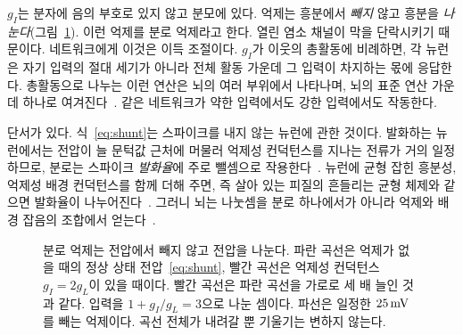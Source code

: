 $g_I$는 분자에 음의 부호로 있지 않고 분모에 있다. 억제는 흥분에서 \emph{빼지} 않고 흥분을 \emph{나눈다}(그림~\ref{fig:shunt}). 이런 억제를 분로 억제라고 한다. 열린 염소 채널이 막을 단락시키기 때문이다. 네트워크에게 이것은 이득 조절이다. $g_I$가 이웃의 총활동에 비례하면, 각 뉴런은 자기 입력의 절대 세기가 아니라 전체 활동 가운데 그 입력이 차지하는 몫에 응답한다. 총활동으로 나누는 이런 연산은 뇌의 여러 부위에서 나타나며, 뇌의 표준 연산 가운데 하나로 여겨진다~\cite{Carandini2012}. 같은 네트워크가 약한 입력에서도 강한 입력에서도 작동한다.

단서가 있다. 식~\eqref{eq:shunt}는 스파이크를 내지 않는 뉴런에 관한 것이다. 발화하는 뉴런에서는 전압이 늘 문턱값 근처에 머물러 억제성 컨덕턴스를 지나는 전류가 거의 일정하므로, 분로는 스파이크 \emph{발화율}에 주로 뺄셈으로 작용한다~\cite{HoltKoch1997}. 뉴런에 균형 잡힌 흥분성, 억제성 배경 컨덕턴스를 함께 더해 주면, 즉 살아 있는 피질의 흔들리는 균형 체제와 같으면 발화율이 나누어진다~\cite{Chance2002}. 그러니 뇌는 나눗셈을 분로 하나에서가 아니라 억제와 배경 잡음의 조합에서 얻는다~\cite{Carandini2012}.

\begin{figure}[t]
\centering
{}
\caption{분로 억제는 전압에서 빼지 않고 전압을 나눈다. 파란 곡선은 억제가 없을 때의 정상 상태 전압~\eqref{eq:shunt}, 빨간 곡선은 억제성 컨덕턴스 $g_I=2g_L$이 있을 때이다. 빨간 곡선은 파란 곡선을 가로로 세 배 늘인 것과 같다. 입력을 $1+g_I/g_L=3$으로 나눈 셈이다. 파선은 일정한 $25\,\text{mV}$를 빼는 억제이다. 곡선 전체가 내려갈 뿐 기울기는 변하지 않는다.}
\label{fig:shunt}
\end{figure}

